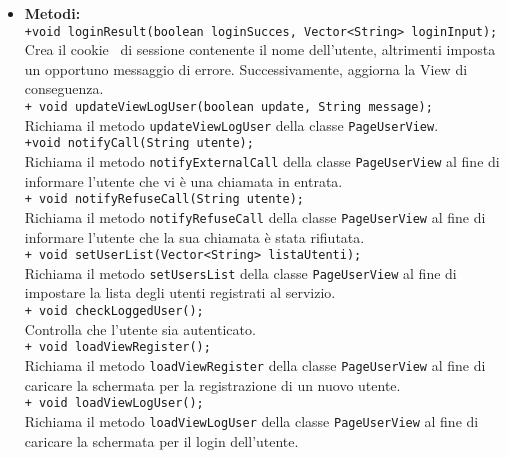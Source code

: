 {{\begin{sloppypar}
{{{\begin{itemize}
				\item[] \textbf{Metodi:}{\\
					\texttt{+void loginResult(boolean loginSucces, Vector<String> loginInput);}\\
					Crea il cookie\g~ di sessione contenente il nome dell'utente, 
					altrimenti imposta un opportuno messaggio di errore.
					Successivamente, aggiorna la View di conseguenza.\\

					\texttt{+ void updateViewLogUser(boolean update, String message);}\\
					Richiama il metodo \texttt{updateViewLogUser} della classe \texttt{PageUserView}.\\

					\texttt{+void notifyCall(String utente);}\\
					Richiama il metodo \texttt{notifyExternalCall} della classe \texttt{PageUserView} al fine di informare l'utente che vi è una chiamata in entrata.\\

					\texttt{+ void notifyRefuseCall(String utente);}\\
					Richiama il metodo \texttt{notifyRefuseCall} della classe \texttt{PageUserView} al fine di informare l'utente che la sua chiamata è stata rifiutata.\\

					\texttt{+ void setUserList(Vector<String> listaUtenti);}\\
					Richiama il metodo \texttt{setUsersList} della classe \texttt{PageUserView} al fine di impostare la lista degli utenti registrati al servizio.\\
					
					\texttt{+ void checkLoggedUser();}\\
					Controlla che l'utente sia autenticato.\\
					
					\texttt{+ void loadViewRegister();}\\
					Richiama il metodo \texttt{loadViewRegister} della classe \texttt{PageUserView} al fine di caricare la schermata per la registrazione di un nuovo utente.\\
					
					\texttt{+ void loadViewLogUser();}\\
					Richiama il metodo \texttt{loadViewLogUser} della classe \texttt{PageUserView} al fine di caricare la schermata per il login dell'utente.\\
					
}
\end{itemize}}}}
\end{sloppypar}}}
